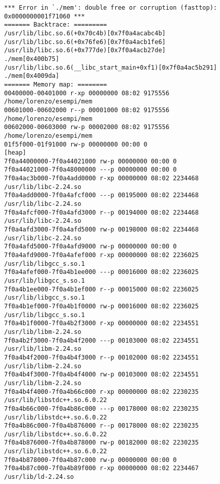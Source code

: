 \begin{itemize}
\begin{tiny}
\begin{shaded}
\begin{verbatim}
*** Error in `./mem': double free or corruption (fasttop): 0x0000000001f71060 ***
======= Backtrace: =========
/usr/lib/libc.so.6(+0x70c4b)[0x7f0a4acabc4b]
/usr/lib/libc.so.6(+0x76fe6)[0x7f0a4acb1fe6]
/usr/lib/libc.so.6(+0x777de)[0x7f0a4acb27de]
./mem[0x400b75]
/usr/lib/libc.so.6(__libc_start_main+0xf1)[0x7f0a4ac5b291]
./mem[0x4009da]
======= Memory map: ========
00400000-00401000 r-xp 00000000 08:02 9175556                            /home/lorenzo/esempi/mem
00601000-00602000 r--p 00001000 08:02 9175556                            /home/lorenzo/esempi/mem
00602000-00603000 rw-p 00002000 08:02 9175556                            /home/lorenzo/esempi/mem
01f5f000-01f91000 rw-p 00000000 00:00 0                                  [heap]
7f0a44000000-7f0a44021000 rw-p 00000000 00:00 0 
7f0a44021000-7f0a48000000 ---p 00000000 00:00 0 
7f0a4ac3b000-7f0a4add0000 r-xp 00000000 08:02 2234468                    /usr/lib/libc-2.24.so
7f0a4add0000-7f0a4afcf000 ---p 00195000 08:02 2234468                    /usr/lib/libc-2.24.so
7f0a4afcf000-7f0a4afd3000 r--p 00194000 08:02 2234468                    /usr/lib/libc-2.24.so
7f0a4afd3000-7f0a4afd5000 rw-p 00198000 08:02 2234468                    /usr/lib/libc-2.24.so
7f0a4afd5000-7f0a4afd9000 rw-p 00000000 00:00 0 
7f0a4afd9000-7f0a4afef000 r-xp 00000000 08:02 2236025                    /usr/lib/libgcc_s.so.1
7f0a4afef000-7f0a4b1ee000 ---p 00016000 08:02 2236025                    /usr/lib/libgcc_s.so.1
7f0a4b1ee000-7f0a4b1ef000 r--p 00015000 08:02 2236025                    /usr/lib/libgcc_s.so.1
7f0a4b1ef000-7f0a4b1f0000 rw-p 00016000 08:02 2236025                    /usr/lib/libgcc_s.so.1
7f0a4b1f0000-7f0a4b2f3000 r-xp 00000000 08:02 2234551                    /usr/lib/libm-2.24.so
7f0a4b2f3000-7f0a4b4f2000 ---p 00103000 08:02 2234551                    /usr/lib/libm-2.24.so
7f0a4b4f2000-7f0a4b4f3000 r--p 00102000 08:02 2234551                    /usr/lib/libm-2.24.so
7f0a4b4f3000-7f0a4b4f4000 rw-p 00103000 08:02 2234551                    /usr/lib/libm-2.24.so
7f0a4b4f4000-7f0a4b66c000 r-xp 00000000 08:02 2230235                    /usr/lib/libstdc++.so.6.0.22
7f0a4b66c000-7f0a4b86c000 ---p 00178000 08:02 2230235                    /usr/lib/libstdc++.so.6.0.22
7f0a4b86c000-7f0a4b876000 r--p 00178000 08:02 2230235                    /usr/lib/libstdc++.so.6.0.22
7f0a4b876000-7f0a4b878000 rw-p 00182000 08:02 2230235                    /usr/lib/libstdc++.so.6.0.22
7f0a4b878000-7f0a4b87c000 rw-p 00000000 00:00 0 
7f0a4b87c000-7f0a4b89f000 r-xp 00000000 08:02 2234467                    /usr/lib/ld-2.24.so

\end{verbatim}
\end{shaded}
\end{tiny}
\end{itemize}

